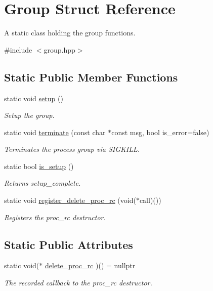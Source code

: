 \hypertarget{struct_group}{}\section{Group Struct Reference}
\label{struct_group}


A static class holding the group functions.  




{\ttfamily \#include $<$group.\+hpp$>$}

\subsection*{Static Public Member Functions}
\begin{DoxyCompactItemize}
\item 
static void \hyperlink{struct_group_a9e2d7e0c56696de4592f1b166188c10a}{setup} ()
\begin{DoxyCompactList}\small\item\em Setup the group. \end{DoxyCompactList}\item 
static void \hyperlink{struct_group_a8867a6d9f7987d3db83bf193bf42f858}{terminate} (const char $\ast$const msg, bool is\+\_\+error=false)
\begin{DoxyCompactList}\small\item\em Terminates the process group via S\+I\+G\+K\+I\+LL. \end{DoxyCompactList}\item 
static bool \hyperlink{struct_group_aeeff4b9cd1c3479d7f4b0ecff08f9bb6}{is\+\_\+setup} ()
\begin{DoxyCompactList}\small\item\em Returns setup\+\_\+complete. \end{DoxyCompactList}\item 
static void \hyperlink{struct_group_a2db75d95407105dceb19a644750d001d}{register\+\_\+delete\+\_\+proc\+\_\+rc} (void($\ast$call)())
\begin{DoxyCompactList}\small\item\em Registers the proc\+\_\+rc destructor. \end{DoxyCompactList}\end{DoxyCompactItemize}
\subsection*{Static Public Attributes}
\begin{DoxyCompactItemize}
\item 
static void($\ast$ \hyperlink{struct_group_a737564dd9819ea8050f6f3019c550da2}{delete\+\_\+proc\+\_\+rc} )() = nullptr
\begin{DoxyCompactList}\small\item\em The recorded callback to the proc\+\_\+rc destructor. \end{DoxyCompactList}\end{DoxyCompactItemize}
